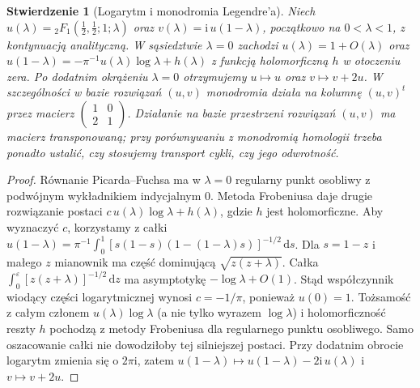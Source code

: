 \documentclass[11pt,a4paper,oneside]{report}
\newcommand{\dd}{\mathrm d}
\theoremstyle{plain}
\newtheorem{stwierdzenie}[twierdzenie]{Stwierdzenie}
\theoremstyle{definition}
\theoremstyle{remark}
\begin{document}
\begin{stwierdzenie}[Logarytm i monodromia Legendre'a]
\label{prop:xv-legendre-T2}
Niech $u(\lambda)={}_2F_1(\frac12,\frac12;1;\lambda)$
oraz $v(\lambda)=\mathrm i\,u(1-\lambda)$, początkowo
na $0<\lambda<1$, z kontynuacją analityczną.
W sąsiedztwie $\lambda=0$ zachodzi
$u(\lambda)=1+O(\lambda)$ oraz
$u(1-\lambda)=-\pi^{-1}u(\lambda)\log\lambda+h(\lambda)$
z funkcją holomorficzną $h$ w otoczeniu zera.
Po dodatnim okrążeniu $\lambda=0$ otrzymujemy
$u\mapsto u$ oraz $v\mapsto v+2u$.
W szczególności w bazie rozwiązań $(u,v)$
monodromia działa na kolumnę $(u,v)^t$ przez macierz
$\left(\begin{smallmatrix}1&0\\2&1\end{smallmatrix}\right)$.
Działanie na bazie przestrzeni rozwiązań $(u,v)$
ma macierz transponowaną; przy porównywaniu z
monodromią homologii trzeba ponadto ustalić,
czy stosujemy transport cykli, czy jego odwrotność.
\end{stwierdzenie}
\begin{proof}
Równanie Picarda--Fuchsa ma w $\lambda=0$
regularny punkt osobliwy z podwójnym wykładnikiem
indycjalnym $0$. Metoda Frobeniusa daje drugie
rozwiązanie postaci $c\,u(\lambda)\log\lambda+h(\lambda)$,
gdzie $h$ jest holomorficzne.
Aby wyznaczyć $c$, korzystamy z całki
$u(1-\lambda)=\pi^{-1}\int_0^1
[s(1-s)(1-(1-\lambda)s)]^{-1/2}\,\dd s$.
Dla $s=1-z$ i małego $z$ mianownik ma część dominującą
$\sqrt{z(z+\lambda)}$. Całka
$\int_0^\varepsilon [z(z+\lambda)]^{-1/2}\,\dd z$
ma asymptotykę $-\log\lambda+O(1)$.
Stąd współczynnik wiodący części logarytmicznej wynosi
$c=-1/\pi$, ponieważ $u(0)=1$.
Tożsamość z całym członem $u(\lambda)\log\lambda$
(a nie tylko wyrazem $\log\lambda$) i holomorficzność
reszty $h$ pochodzą z metody Frobeniusa dla regularnego
punktu osobliwego. Samo oszacowanie całki nie dowodziłoby
tej silniejszej postaci.
Przy dodatnim obrocie logarytm zmienia się o $2\pi\mathrm i$,
zatem $u(1-\lambda)\mapsto u(1-\lambda)-2\mathrm i\,u(\lambda)$
i $v\mapsto v+2u$.
\end{proof}
\end{document}
